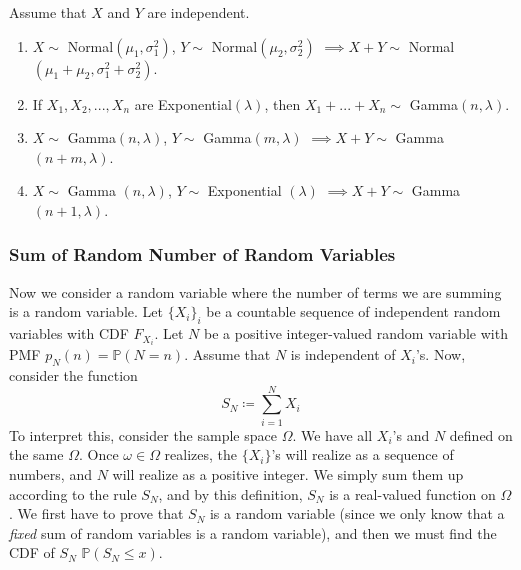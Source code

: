 \documentclass{article}
\begin{document}
      \begin{theorem}
        Assume that $X$ and $Y$ are independent. 
        \begin{enumerate}
          \item $X \sim$ Normal$(\mu_1, \sigma_1^2)$, $Y \sim$ Normal$(\mu_2, \sigma_2^2)$ $\implies X + Y \sim$ Normal $(\mu_1 + \mu_2, \sigma_1^2 + \sigma_2^2)$. 
          \item If $X_1, X_2, ..., X_n$ are Exponential$(\lambda)$, then $X_1 + ... + X_n \sim$ Gamma$(n, \lambda)$.
          \item $X \sim$ Gamma$(n, \lambda)$, $Y \sim$ Gamma$(m, \lambda)$ $\implies X + Y \sim$ Gamma$(n + m, \lambda)$. 
          \item $X \sim$ Gamma $(n, \lambda)$, $Y \sim$ Exponential $(\lambda)$ $\implies X + Y \sim$ Gamma$(n+1, \lambda)$. 
        \end{enumerate}
      \end{theorem}

    \subsubsection{Sum of Random Number of Random Variables}

      Now we consider a random variable where the number of terms we are summing is a random variable. Let $\{X_i\}_i$ be a countable sequence of independent random variables with CDF $F_{X_i}$. Let $N$ be a positive integer-valued random variable with PMF $p_N(n) = \mathbb{P}(N = n)$. Assume that $N$ is independent of $X_i$'s. Now, consider the function 
      \begin{equation}
        S_N \coloneqq \sum_{i=1}^N X_i
      \end{equation}
      To interpret this, consider the sample space $\Omega$. We have all $X_i$'s and $N$ defined on the same $\Omega$. Once $\omega \in \Omega$ realizes, the $\{X_i\}$'s will realize as a sequence of numbers, and $N$ will realize as a positive integer. We simply sum them up according to the rule $S_N$, and by this definition, $S_N$ is a real-valued function on $\Omega$. We first have to prove that $S_N$ is a random variable (since we only know that a \textit{fixed} sum of random variables is a random variable), and then we must find the CDF of $S_N$ $\mathbb{P}(S_N \leq x)$. 
\end{document}
